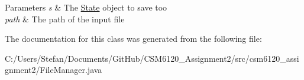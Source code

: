\begin{DoxyParams}{Parameters}
{\em s} & The \hyperlink{classcsm6120__assignment2_1_1_state}{State} object to save too \\
\hline
{\em path} & The path of the input file \\
\hline
\end{DoxyParams}


The documentation for this class was generated from the following file\+:\begin{DoxyCompactItemize}
\item 
C\+:/\+Users/\+Stefan/\+Documents/\+Git\+Hub/\+C\+S\+M6120\+\_\+\+Assignment2/src/csm6120\+\_\+assignment2/File\+Manager.\+java\end{DoxyCompactItemize}
